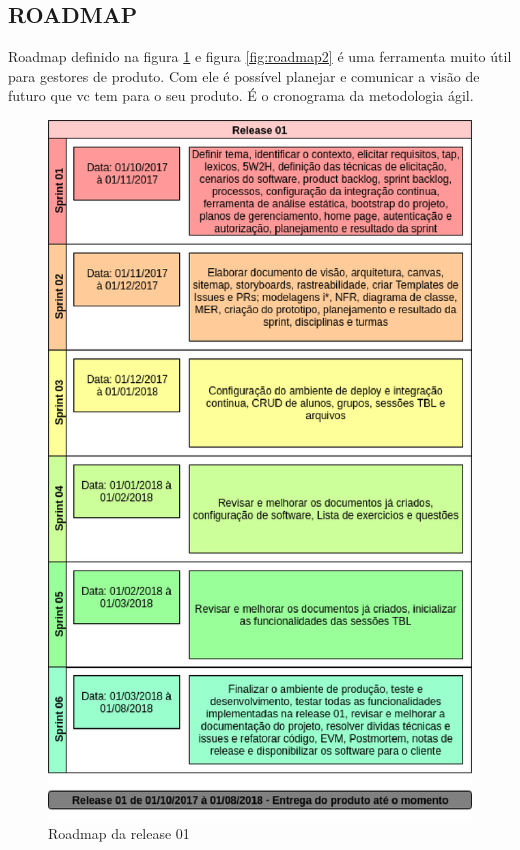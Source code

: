 \subsection{ROADMAP}

Roadmap definido na figura \ref{fig:roadmap1} e figura \ref{fig:roadmap2} é uma ferramenta muito útil para gestores de produto. Com ele é possível planejar e comunicar a visão de futuro que vc tem para o seu produto. É o cronograma da metodologia ágil.

\begin{figure}[h!]
	\centering
  \includegraphics[keepaspectratio=true,scale=0.8]{figuras/roadmap.eps}
  \caption{Roadmap da release 01}
	\label{fig:roadmap1}
\end{figure}

